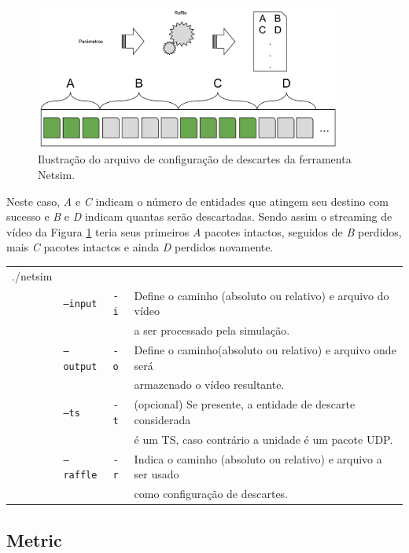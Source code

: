 \begin{figure}[!htb]
	\centering
	\includegraphics[width=0.9\textwidth]{./imgs/netsim.png}
	\caption{Ilustração do arquivo de configuração de descartes da ferramenta Netsim.}
	\label{fig:netsim}
\end{figure}

Neste caso, \emph{A} e \emph{C} indicam o número de entidades que atingem seu destino com sucesso e \emph{B} e \emph{D} indicam quantas serão descartadas. 
Sendo assim o streaming de vídeo da Figura \ref{fig:netsim}  teria seus primeiros \emph{A} pacotes intactos, seguidos de \emph{B} perdidos, mais \emph{C} pacotes intactos e ainda \emph{D} perdidos novamente.

\begin{table}[!h]
	\begin{tabular}{llll}
	./netsim & & \\
	& \texttt{--input} & \texttt{-i} & Define o caminho (absoluto ou relativo) e arquivo do vídeo \\ 
	& & & a ser processado pela simulação. \\
	& \texttt{--output} & \texttt{-o} & Define o caminho(absoluto ou relativo) e arquivo onde será \\ 
	& & & armazenado o vídeo resultante. \\
	& \texttt{--ts} & \texttt{-t} & (opcional) Se presente, a entidade de descarte considerada \\
	& & & é um TS, caso contrário a unidade é um pacote UDP. \\
	& \texttt{--raffle} & \texttt{-r} & Indica o caminho (absoluto ou relativo) e arquivo a ser usado \\ 
	& & & como configuração de descartes. \\
	\end{tabular}
\end{table}


\subsection{Metric}
\label{des:metric}

